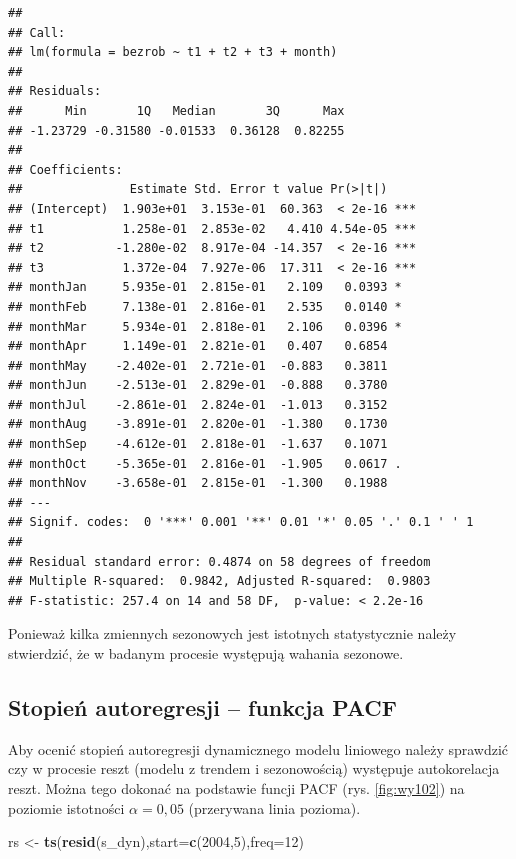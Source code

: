 \documentclass[polish,]{book}
\newenvironment{Shaded}{\begin{snugshade}}{\end{snugshade}}
\newcommand{\DataTypeTok}[1]{\textcolor[rgb]{0.13,0.29,0.53}{#1}}
\newcommand{\DecValTok}[1]{\textcolor[rgb]{0.00,0.00,0.81}{#1}}
\newcommand{\KeywordTok}[1]{\textcolor[rgb]{0.13,0.29,0.53}{\textbf{#1}}}
\newcommand{\NormalTok}[1]{#1}
\newcommand{\StringTok}[1]{\textcolor[rgb]{0.31,0.60,0.02}{#1}}
\begin{document}
\begin{verbatim}
## 
## Call:
## lm(formula = bezrob ~ t1 + t2 + t3 + month)
## 
## Residuals:
##      Min       1Q   Median       3Q      Max 
## -1.23729 -0.31580 -0.01533  0.36128  0.82255 
## 
## Coefficients:
##               Estimate Std. Error t value Pr(>|t|)    
## (Intercept)  1.903e+01  3.153e-01  60.363  < 2e-16 ***
## t1           1.258e-01  2.853e-02   4.410 4.54e-05 ***
## t2          -1.280e-02  8.917e-04 -14.357  < 2e-16 ***
## t3           1.372e-04  7.927e-06  17.311  < 2e-16 ***
## monthJan     5.935e-01  2.815e-01   2.109   0.0393 *  
## monthFeb     7.138e-01  2.816e-01   2.535   0.0140 *  
## monthMar     5.934e-01  2.818e-01   2.106   0.0396 *  
## monthApr     1.149e-01  2.821e-01   0.407   0.6854    
## monthMay    -2.402e-01  2.721e-01  -0.883   0.3811    
## monthJun    -2.513e-01  2.829e-01  -0.888   0.3780    
## monthJul    -2.861e-01  2.824e-01  -1.013   0.3152    
## monthAug    -3.891e-01  2.820e-01  -1.380   0.1730    
## monthSep    -4.612e-01  2.818e-01  -1.637   0.1071    
## monthOct    -5.365e-01  2.816e-01  -1.905   0.0617 .  
## monthNov    -3.658e-01  2.815e-01  -1.300   0.1988    
## ---
## Signif. codes:  0 '***' 0.001 '**' 0.01 '*' 0.05 '.' 0.1 ' ' 1
## 
## Residual standard error: 0.4874 on 58 degrees of freedom
## Multiple R-squared:  0.9842, Adjusted R-squared:  0.9803 
## F-statistic: 257.4 on 14 and 58 DF,  p-value: < 2.2e-16
\end{verbatim}

Ponieważ kilka zmiennych sezonowych jest istotnych statystycznie należy stwierdzić, że w badanym procesie występują wahania sezonowe.

\hypertarget{part_10.2.3}{%
\subsection{Stopień autoregresji -- funkcja PACF}\label{part_10.2.3}}

Aby ocenić stopień autoregresji dynamicznego modelu liniowego należy sprawdzić
czy w procesie reszt (modelu z trendem i sezonowością) występuje autokorelacja
reszt. Można tego dokonać na podstawie funcji PACF (rys. \ref{fig:wy102}) na poziomie istotności \(\alpha = 0,05\) (przerywana linia pozioma).

\begin{Shaded}
\begin{Highlighting}[]
\NormalTok{rs <-}\StringTok{ }\KeywordTok{ts}\NormalTok{(}\KeywordTok{resid}\NormalTok{(s_dyn),}\DataTypeTok{start=}\KeywordTok{c}\NormalTok{(}\DecValTok{2004}\NormalTok{,}\DecValTok{5}\NormalTok{),}\DataTypeTok{freq=}\DecValTok{12}\NormalTok{)}
\end{Highlighting}
\end{Shaded}
\end{document}
